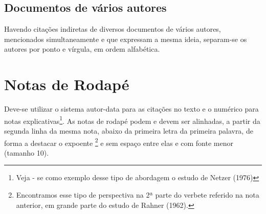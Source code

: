
\cite{quatroautores}

\subsection{Documentos de vários autores}

Havendo    citações    indiretas de    diversos    documentos    de    vários    autores, mencionados  simultaneamente e  que  expressam  a  mesma  ideia,  separam-se  os  autores  por ponto e vírgula, em ordem alfabética.

\cite{tresautores, quatroautores}

\section{Notas de Rodap\'{e}}

Deve-se utilizar o sistema autor-data para as  citações no texto e o numérico para notas explicativas\footnote{Veja - se como exemplo desse tipo de abordagem o estudo de Netzer (1976)}. As notas de rodapé podem e devem ser alinhadas, a partir da segunda linha da mesma nota, abaixo da primeira letra da primeira palavra, de forma a destacar o expoente \footnote{Encontramos  esse  tipo  de  perspectiva  na  2ª  parte  do  verbete  referido  na  nota  anterior,  em  grande  parte  do estudo de Rahner (1962).} e sem espaço entre elas e com fonte menor (tamanho 10).
